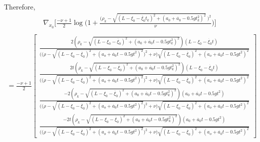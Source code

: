 \documentclass[11pt]{article}
\begin{document}
Therefore, 
\begin{align*}
    \nabla_{x_0}\Bigg[\frac{-\nu+1}{2}\log\Bigg(1+ \frac{\Big(\rho_k - \sqrt{(L-\xi_0 - \dot{\xi_0}t_k)^2 + (a_0 + \dot{a_0} - 0.5gt_k^2)^2} \ \Big)^2}{\nu}\Bigg)\Bigg] \\
\end{align*}
\begin{align}
    = \frac{-\nu+1}{2} \begin{bmatrix}
        \frac{2(\rho_k - \sqrt{(L-\xi_0 - \dot{\xi_0})^2 + (a_0 + \dot{a_0}t - 0.5gt_k^2)^2})(L-\xi_0-\dot{\xi_0}t)}
    {\Big(\Big(\rho - \sqrt{(L-\xi_0-\dot{\xi_0})^2 + (a_o + \dot{a_0}t-0.5gt^2)^2}\Big)^2 + \nu\Big)\sqrt{(L-\xi_0-\dot{\xi_0})^2 + (a_o + \dot{a_0}t-0.5gt^2)^2}}  \\
    \frac{2t(\rho_k - \sqrt{(L-\xi_0 - \dot{\xi_0})^2 + (a_0 + \dot{a_0}t - 0.5gt_k^2)^2})(L-\xi_0-\dot{\xi_0}t)}
    {\Big(\Big(\rho - \sqrt{(L-\xi_0-\dot{\xi_0})^2 + (a_o + \dot{a_0}t-0.5gt^2)^2}\Big)^2 + \nu\Big)\sqrt{(L-\xi_0-\dot{\xi_0})^2 + (a_o + \dot{a_0}t-0.5gt^2)^2}} \\
    \frac{-2(\rho_k - \sqrt{(L-\xi_0 - \dot{\xi_0})^2 + (a_0 + \dot{a_0}t - 0.5gt_k^2)^2})(a_0+\dot{a_0}t-0.5gt^2)}
    {\Big(\Big(\rho - \sqrt{(L-\xi_0-\dot{\xi_0})^2 + (a_o + \dot{a_0}t-0.5gt^2)^2}\Big)^2 + \nu\Big)\sqrt{(L-\xi_0-\dot{\xi_0})^2 + (a_o + \dot{a_0}t-0.5gt^2)^2}} \\
    \frac{-2t(\rho_k - \sqrt{(L-\xi_0 - \dot{\xi_0})^2 + (a_0 + \dot{a_0}t - 0.5gt_k^2)^2})(a_0+\dot{a_0}t-0.5gt^2)}
    {\Big(\Big(\rho - \sqrt{(L-\xi_0-\dot{\xi_0})^2 + (a_o + \dot{a_0}t-0.5gt^2)^2}\Big)^2 + \nu\Big)\sqrt{(L-\xi_0-\dot{\xi_0})^2 + (a_o + \dot{a_0}t-0.5gt^2)^2}} 
    \end{bmatrix}
    \label{Grad1}
\end{align}
\end{document}
